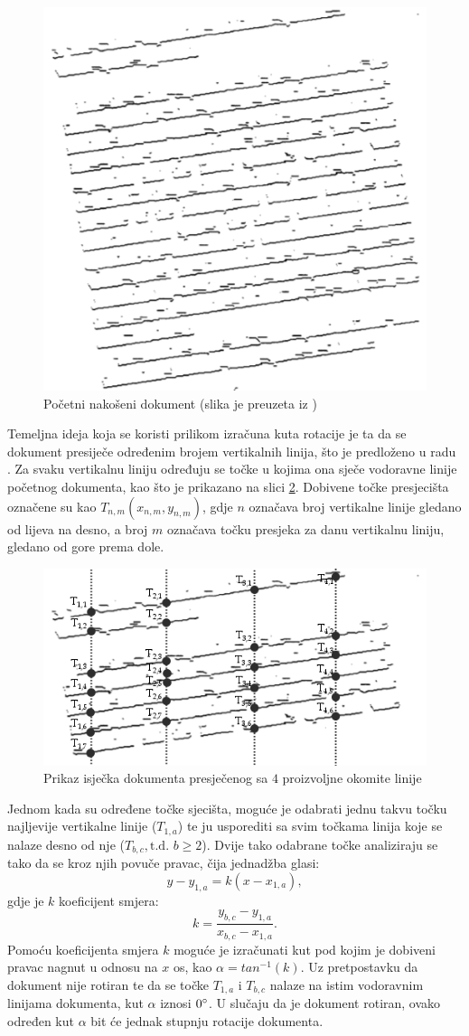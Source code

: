 \documentclass[times, utf8, zavrsni, numeric]{fer}
\begin{document}
\begin{figure}[ht!] 
    \centering
    \includegraphics[width=.4\textwidth]{Images/Skew_original.png}
    \captionsetup{justification=centering}
    \caption{Početni nakošeni dokument (slika je preuzeta iz \cite{article:Skew-detection})}
    \label{fig:skew_original}
\end{figure}

Temeljna ideja koja se koristi prilikom izračuna kuta rotacije je ta da se dokument presiječe određenim brojem vertikalnih linija, što je predloženo u radu \cite{article:Skew-detection}.
Za svaku vertikalnu liniju određuju se točke u kojima ona sječe vodoravne linije početnog dokumenta, kao što je prikazano na slici \ref{fig:skew_points}.
Dobivene točke presjecišta označene su kao $T_{n, m}(x_{n, m}, y_{n, m})$, gdje $n$ označava broj vertikalne linije gledano od lijeva na desno, a broj $m$ označava točku presjeka za danu vertikalnu liniju, gledano od gore prema dole.

\begin{figure}[ht!] 
    \centering
    \includegraphics[width=.7\textwidth]{Images/Skew_points.png}
    \captionsetup{justification=centering}
    \caption{Prikaz isječka dokumenta presječenog sa $4$ proizvoljne okomite linije}
    \label{fig:skew_points}
\end{figure}

Jednom kada su određene točke sjecišta, moguće je odabrati jednu takvu točku najljevije vertikalne linije ($T_{1, a}$) te  ju usporediti sa svim točkama linija koje se nalaze desno od nje ($T_{b, c}, \text{t.d. } b \geq 2$).
Dvije tako odabrane točke analiziraju se tako da se kroz njih povuče pravac, čija jednadžba glasi: 
\[
    y - y_{1, a} = k(x - x_{1, a}),
\]
gdje je $k$ koeficijent smjera:
\[
    k = \frac{y_{b, c} - y_{1, a}}{x_{b, c} - x_{1, a}}.
\]
Pomoću koeficijenta  smjera $k$ moguće je izračunati kut pod kojim je dobiveni pravac nagnut u odnosu na $x$ os, kao $\alpha = tan^{-1}(k)$.
Uz pretpostavku da dokument nije rotiran te da se točke $T_{1, a}$ i $T_{b, c}$ nalaze na istim vodoravnim linijama dokumenta, kut $\alpha$ iznosi $0\degree$.
U slučaju da je dokument rotiran, ovako određen kut $\alpha$ bit će jednak stupnju rotacije dokumenta.\\
\end{document}
